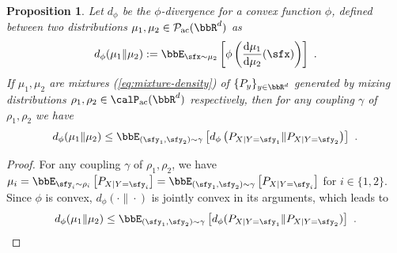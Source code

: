 \documentclass[11pt]{article}
\newtheorem{proposition}{Proposition}[section]
\newcounter{ct}
\newcommand{\rmd}{\mathrm{d}}
\begin{document}
\begin{proposition}
\label{prop:f-divergence-coupling}
Let \(d_{\phi}\) be the \(\phi\)-divergence for a convex function \(\phi\), defined between two distributions \(\mu_{1}, \mu_{2} \in \mathcal{P}_{\mathrm{ac}}(\bbR^{d})\) as
\begin{equation*}
    d_{\phi}(\mu_{1} \| \mu_{2}) := \bbE_{\sfx \sim \mu_{2}}\left[\phi\left(\frac{\rmd \mu_{1}}{\rmd \mu_{2}}(\sfx)\right)\right]~.
\end{equation*}
If \(\mu_{1}, \mu_{2}\) are mixtures \emph{(\cref{eq:mixture-density})} of \(\{P_{y}\}_{y \in \bbR^{d}}\) generated by mixing distributions \(\rho_{1}, \rho_{2} \in \calP_{\mathrm{ac}}(\bbR^{d})\) respectively, then for any coupling \(\gamma\) of \(\rho_{1}, \rho_{2}\) we have
\begin{equation*}
    d_{\phi}(\mu_{1} \| \mu_{2}) \leq \bbE_{(\sfy_{1}, \sfy_{2}) \sim \gamma}\left[d_{\phi}\left(P_{X | Y = \sfy_{1}} \| P_{X | Y = \sfy_{2}}\right)\right]~.
\end{equation*}
\end{proposition}
\begin{proof}
For any coupling \(\gamma\) of \(\rho_{1}, \rho_{2}\), we have \(\mu_{i} = \bbE_{\sfy_{i} \sim \rho_{i}}\left[P_{X | Y = \sfy_{i}}\right] = \bbE_{(\sfy_{1}, \sfy_{2}) \sim \gamma}\left[P_{X | Y = \sfy_{i}} \right]\) for \(i \in \{1, 2\}\).
Since \(\phi\) is convex, \(d_{\phi}(\cdot \| \cdot)\) is jointly convex in its arguments, which leads to
\begin{equation*}
    d_{\phi}(\mu_{1} \| \mu_{2}) \leq \bbE_{(\sfy_{1}, \sfy_{2}) \sim \gamma}\left[d_{\phi}(P_{X | Y = \sfy_{1}} \| P_{X | Y = \sfy_{2}})\right]~.
\end{equation*}
\end{proof}
\end{document}
